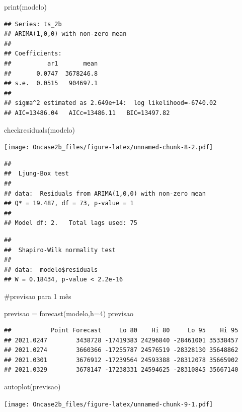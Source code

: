 \documentclass[
]{article}
\newenvironment{Shaded}{\begin{snugshade}}{\end{snugshade}}
\newcommand{\AttributeTok}[1]{\textcolor[rgb]{0.77,0.63,0.00}{#1}}
\newcommand{\DecValTok}[1]{\textcolor[rgb]{0.00,0.00,0.81}{#1}}
\newcommand{\FunctionTok}[1]{\textcolor[rgb]{0.00,0.00,0.00}{#1}}
\newcommand{\NormalTok}[1]{#1}
\newcommand{\OtherTok}[1]{\textcolor[rgb]{0.56,0.35,0.01}{#1}}
\newcommand{\SpecialCharTok}[1]{\textcolor[rgb]{0.00,0.00,0.00}{#1}}
\begin{document}
\begin{Shaded}
\begin{Highlighting}[]
\FunctionTok{print}\NormalTok{(modelo)}
\end{Highlighting}
\end{Shaded}

\begin{verbatim}
## Series: ts_2b 
## ARIMA(1,0,0) with non-zero mean 
## 
## Coefficients:
##          ar1       mean
##       0.0747  3678246.8
## s.e.  0.0515   904697.1
## 
## sigma^2 estimated as 2.649e+14:  log likelihood=-6740.02
## AIC=13486.04   AICc=13486.11   BIC=13497.82
\end{verbatim}

\begin{Shaded}
\begin{Highlighting}[]
\FunctionTok{checkresiduals}\NormalTok{(modelo)}
\end{Highlighting}
\end{Shaded}

\texttt{[image: Oncase2b\_files/figure-latex/unnamed-chunk-8-2.pdf]}

\begin{verbatim}
## 
##  Ljung-Box test
## 
## data:  Residuals from ARIMA(1,0,0) with non-zero mean
## Q* = 19.487, df = 73, p-value = 1
## 
## Model df: 2.   Total lags used: 75
\end{verbatim}

\begin{Shaded}
\end{Shaded}

\begin{verbatim}
## 
##  Shapiro-Wilk normality test
## 
## data:  modelo$residuals
## W = 0.18434, p-value < 2.2e-16
\end{verbatim}

\#previsao para 1 mês

\begin{Shaded}
\begin{Highlighting}[]
\NormalTok{previsao }\OtherTok{=} \FunctionTok{forecast}\NormalTok{(modelo,}\AttributeTok{h=}\DecValTok{4}\NormalTok{)}
\NormalTok{previsao}
\end{Highlighting}
\end{Shaded}

\begin{verbatim}
##           Point Forecast     Lo 80    Hi 80     Lo 95    Hi 95
## 2021.0247        3438728 -17419383 24296840 -28461001 35338457
## 2021.0274        3660366 -17255787 24576519 -28328130 35648862
## 2021.0301        3676912 -17239564 24593388 -28312078 35665902
## 2021.0329        3678147 -17238331 24594625 -28310845 35667140
\end{verbatim}

\begin{Shaded}
\begin{Highlighting}[]
\FunctionTok{autoplot}\NormalTok{(previsao)}
\end{Highlighting}
\end{Shaded}

\texttt{[image: Oncase2b\_files/figure-latex/unnamed-chunk-9-1.pdf]}
\end{document}

